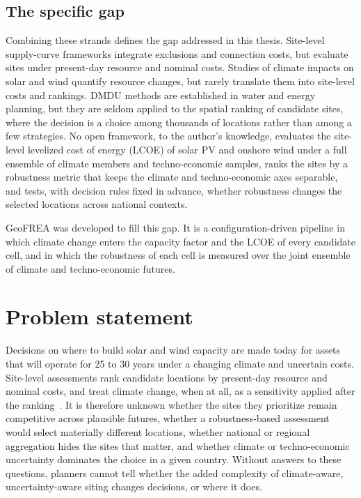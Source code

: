 \subsection{The specific gap}

Combining these strands defines the gap addressed in this thesis. Site-level supply-curve frameworks integrate exclusions and connection costs, but evaluate sites under present-day resource and nominal costs. Studies of climate impacts on solar and wind quantify resource changes, but rarely translate them into site-level costs and rankings. DMDU methods are established in water and energy planning, but they are seldom applied to the spatial ranking of candidate sites, where the decision is a choice among thousands of locations rather than among a few strategies. No open framework, to the author's knowledge, evaluates the site-level levelized cost of energy (LCOE) of solar PV and onshore wind under a full ensemble of climate members and techno-economic samples, ranks the sites by a robustness metric that keeps the climate and techno-economic axes separable, and tests, with decision rules fixed in advance, whether robustness changes the selected locations across national contexts. %

GeoFREA was developed to fill this gap. It is a configuration-driven pipeline in which climate change enters the capacity factor and the LCOE of every candidate cell, and in which the robustness of each cell is measured over the joint ensemble of climate and techno-economic futures. %

\section{Problem statement}
\label{sec:problem}

Decisions on where to build solar and wind capacity are made today for assets that will operate for 25 to 30 years under a changing climate and uncertain costs. Site-level assessments rank candidate locations by present-day resource and nominal costs, and treat climate change, when at all, as a sensitivity applied after the ranking~\cite{craig2018review, ashraf2024_climate_smart_siting}. It is therefore unknown whether the sites they prioritize remain competitive across plausible futures, whether a robustness-based assessment would select materially different locations, whether national or regional aggregation hides the sites that matter, and whether climate or techno-economic uncertainty dominates the choice in a given country. Without answers to these questions, planners cannot tell whether the added complexity of climate-aware, uncertainty-aware siting changes decisions, or where it does.

